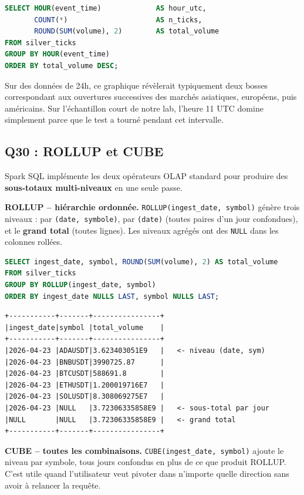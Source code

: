 \documentclass{RapportINPTCLOUD}
\begin{document}
\begin{lstlisting}[style=code, language=SQL]
SELECT HOUR(event_time)             AS hour_utc,
       COUNT(*)                     AS n_ticks,
       ROUND(SUM(volume), 2)        AS total_volume
FROM silver_ticks
GROUP BY HOUR(event_time)
ORDER BY total_volume DESC;
\end{lstlisting}

Sur des donn\'{e}es de 24h, ce graphique r\'{e}v\`{e}lerait typiquement deux \og bosses\fg{} correspondant aux ouvertures successives des march\'{e}s asiatiques, europ\'{e}ens, puis am\'{e}ricains. Sur l'\'{e}chantillon court de notre lab, l'heure 11 UTC domine simplement parce que le test a tourn\'{e} pendant cet intervalle.

\subsection{Q30 : ROLLUP et CUBE}

Spark SQL impl\'{e}mente les deux op\'{e}rateurs OLAP standard pour produire des \textbf{sous-totaux multi-niveaux} en une seule passe.

\textbf{ROLLUP -- hi\'{e}rarchie ordonn\'{e}e.} \texttt{ROLLUP(ingest\_date, symbol)} g\'{e}n\`{e}re trois niveaux : par \texttt{(date, symbole)}, par \texttt{(date)} (toutes paires d'un jour confondues), et le \textbf{grand total} (toutes lignes). Les niveaux agr\'{e}g\'{e}s ont des \texttt{NULL} dans les colonnes \og roll\'{e}es\fg{}.

\begin{lstlisting}[style=code, language=SQL]
SELECT ingest_date, symbol, ROUND(SUM(volume), 2) AS total_volume
FROM silver_ticks
GROUP BY ROLLUP(ingest_date, symbol)
ORDER BY ingest_date NULLS LAST, symbol NULLS LAST;
\end{lstlisting}

\begin{lstlisting}[style=code]
+-----------+-------+----------------+
|ingest_date|symbol |total_volume    |
+-----------+-------+----------------+
|2026-04-23 |ADAUSDT|3.623403051E9   |   <- niveau (date, sym)
|2026-04-23 |BNBUSDT|3990725.87      |
|2026-04-23 |BTCUSDT|588691.8        |
|2026-04-23 |ETHUSDT|1.200019716E7   |
|2026-04-23 |SOLUSDT|8.308069275E7   |
|2026-04-23 |NULL   |3.72306335858E9 |   <- sous-total par jour
|NULL       |NULL   |3.72306335858E9 |   <- grand total
+-----------+-------+----------------+
\end{lstlisting}

\textbf{CUBE -- toutes les combinaisons.} \texttt{CUBE(ingest\_date, symbol)} ajoute le niveau \og par symbole, tous jours confondus\fg{} en plus de ce que produit ROLLUP. C'est utile quand l'utilisateur veut pivoter dans n'importe quelle direction sans avoir \`{a} relancer la requ\^{e}te.
\end{document}
